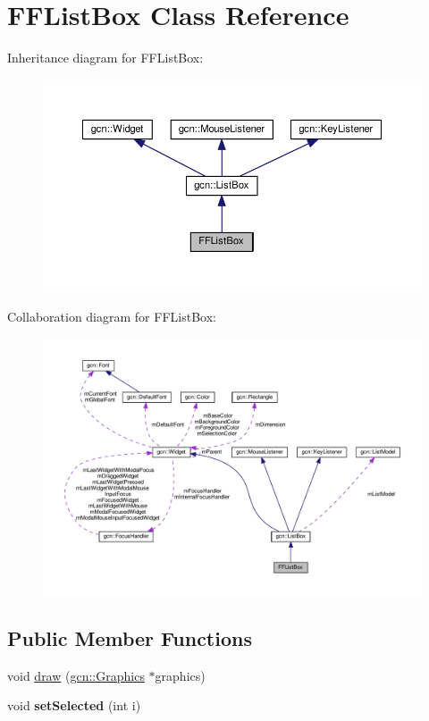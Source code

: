 \hypertarget{classFFListBox}{}\section{F\+F\+List\+Box Class Reference}
\label{classFFListBox}


Inheritance diagram for F\+F\+List\+Box\+:\nopagebreak
\begin{figure}[H]
\begin{center}
\leavevmode
\includegraphics[width=350pt]{classFFListBox__inherit__graph}
\end{center}
\end{figure}


Collaboration diagram for F\+F\+List\+Box\+:\nopagebreak
\begin{figure}[H]
\begin{center}
\leavevmode
\includegraphics[width=350pt]{classFFListBox__coll__graph}
\end{center}
\end{figure}
\subsection*{Public Member Functions}
\begin{DoxyCompactItemize}
\item 
void \hyperlink{classFFListBox_a37cb82f6ca370d2065107079454b086d}{draw} (\hyperlink{classgcn_1_1Graphics}{gcn\+::\+Graphics} $\ast$graphics)
\item 
void {\bfseries set\+Selected} (int i)\hypertarget{classFFListBox_ac1ed7a25db5b010b15918366756be2db}{}\label{classFFListBox_ac1ed7a25db5b010b15918366756be2db}

\end{DoxyCompactItemize}
